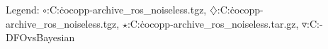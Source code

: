 Legend: {\color{NavyBlue}$\circ$}:C:\Users\dimo\.cocopp\data-archive\bbob{}\FULLNEWUOA\_ros\_noiseless.tgz, {\color{Magenta}$\diamondsuit$}:C:\Users\dimo\.cocopp\data-archive\bbob{}\NEWUOA\_ros\_noiseless.tgz, {\color{Orange}$\star$}:C:\Users\dimo\.cocopp\data-archive\bbob{}\AVGNEWUOA\_ros\_noiseless.tar.gz, {\color{CornflowerBlue}$\triangledown$}:C:\Users\dimo\Desktop{}-DFOvsBayesian\exdata\DFO